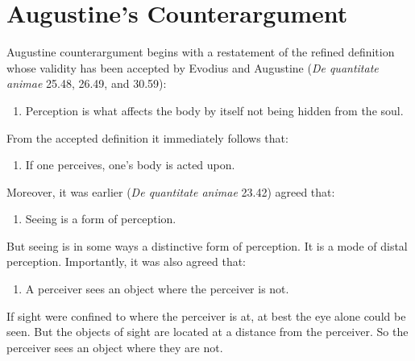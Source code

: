 \documentclass[12pt]{article}
\begin{document}


\section{Augustine's Counterargument} %
\label{sec:augustine_s_counterargument}

Augustine counterargument begins with a restatement of the refined definition whose validity has been accepted by Evodius and Augustine (\emph{De quantitate animae} 25.48, 26.49, and 30.59):
\begin{enumerate}[(1)]
	\item Perception is what affects the body by itself not being hidden from the soul.
\end{enumerate}
From the accepted definition it immediately follows that:
\begin{enumerate}[(2)]
	\item If one perceives, one's body is acted upon.
\end{enumerate}
Moreover, it was earlier (\emph{De quantitate animae} 23.42) agreed that:
\begin{enumerate}[(3)]
	\item Seeing is a form of perception.
\end{enumerate}
But seeing is in some ways a distinctive form of perception. It is a mode of distal perception. Importantly, it was also agreed that:
\begin{enumerate}[(4)]
	\item A perceiver sees an object where the perceiver is not.
\end{enumerate}
If sight were confined to where the perceiver is at, at best the eye alone could be seen. But the objects of sight are located at a distance from the perceiver. So the perceiver sees an object where they are not. 
\end{document}
